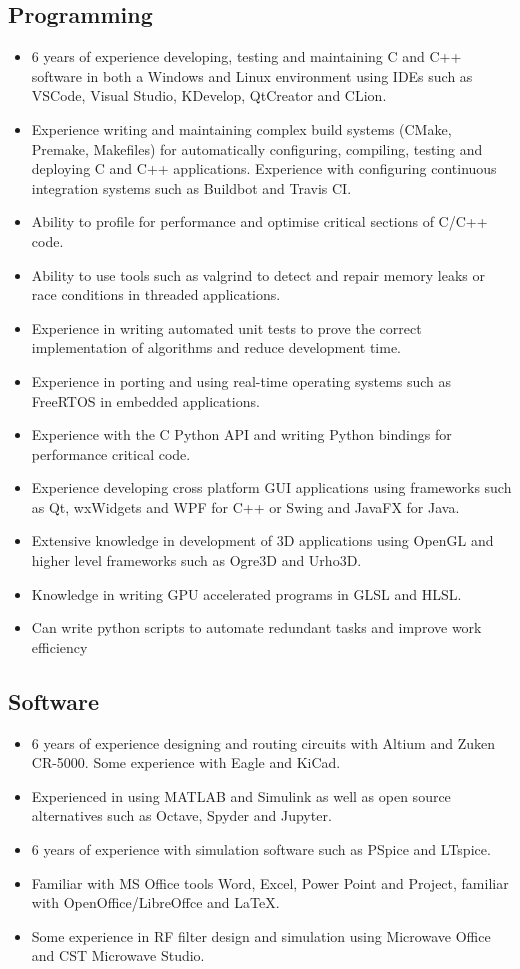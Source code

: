 \documentclass[]{friggeri-cv}
\begin{document}
\subsection{Programming}
\begin{itemize}
    \item 6 years of experience developing, testing and maintaining C and C++ software in both a Windows and Linux environment using IDEs such as VSCode, Visual Studio, KDevelop, QtCreator and CLion.
    \item Experience writing and maintaining complex build systems (CMake, Premake, Makefiles) for automatically configuring, compiling, testing and deploying C and C++ applications. Experience with configuring continuous integration systems such as Buildbot and Travis CI.
    \item Ability to profile for performance and optimise critical sections of C/C++ code.
    \item Ability to use tools such as valgrind to detect and repair memory leaks or race conditions in threaded applications.
    \item Experience in writing automated unit tests to prove the correct implementation of algorithms and reduce development time.
    \item Experience in porting and using real-time operating systems such as FreeRTOS in embedded applications.
    \item Experience with the C Python API and writing Python bindings for performance critical code.
    \item Experience developing cross platform GUI applications using frameworks such as Qt, wxWidgets and WPF for C++ or Swing and JavaFX for Java.
    \item Extensive knowledge in development of 3D applications using OpenGL and higher level frameworks such as Ogre3D and Urho3D.
    \item Knowledge in writing GPU accelerated programs in GLSL and HLSL.
    \item Can write python scripts to automate redundant tasks and improve work efficiency
\end{itemize}

\subsection{Software}
\begin{itemize}
    \item 6 years of experience designing and routing circuits with Altium and Zuken CR-5000. Some experience with Eagle and KiCad.
    \item Experienced in using MATLAB and Simulink as well as open source alternatives such as Octave, Spyder and Jupyter.
    \item 6 years of experience with simulation software such as PSpice and LTspice.
    \item Familiar with MS Office tools Word, Excel, Power Point and Project, familiar with OpenOffice/LibreOffce and LaTeX.
    \item Some experience in RF filter design and simulation using Microwave Office and CST Microwave Studio.
\end{itemize}
\end{document}
